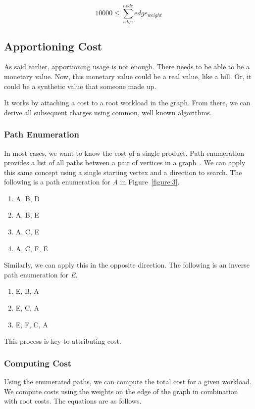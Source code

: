 \documentclass[10pt, a4paper, twocolumn]{article}
\begin{document}
    \[ 10000 \leq \sum_{edge}^{node} edge_{weight} \]

  \subsection*{Apportioning Cost}
    As said earlier, apportioning usage is not enough.
    There needs to be able to be a monetary value.
    Now, this monetary value could be a real value, like a bill.
    Or, it could be a synthetic value that someone made up.

    It works by attaching a cost to a root workload in the graph.
    From there, we can derive all subsequent charges using common, well known algorithms.

    \subsubsection*{Path Enumeration}
      In most cases, we want to know the cost of a single product.
      Path enumeration provides a list of all paths between a pair of vertices in a graph~\cite{Grossi2016}.
      We can apply this same concept using a single starting vertex and a direction to search.
      The following is a path enumeration for \textit{A} in Figure~\ref{figure:3}.

      \begin{enumerate}
        \item A, B, D
        \item A, B, E
        \item A, C, E
        \item A, C, F, E
      \end{enumerate}

      Similarly, we can apply this in the opposite direction.
      The following is an inverse path enumeration for \textit{E}.

      \begin{enumerate}
        \item E, B, A
        \item E, C, A
        \item E, F, C, A
      \end{enumerate}

      This process is key to attributing cost.

    \subsubsection*{Computing Cost}
      Using the enumerated paths, we can compute the total cost for a given workload.
      We compute costs using the weights on the edge of the graph in combination with root costs.
      The equations are as follows.
\end{document}
